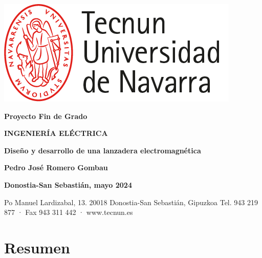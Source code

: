 \documentclass[a4paper,12pt]{article}
\newcommand{\boldcenteredtext}[1]{
  \begin{center}
    \textbf{\fontsize{12pt}{14pt}\selectfont #1}
  \end{center}
}
\newcommand{\largeboldcenteredtext}[1]{
  \begin{center}
    \textbf{\fontsize{16pt}{18pt}\selectfont #1}
  \end{center}
}
\newcommand{\boldrightalignedtext}[1]{
  \begin{flushright}
    \textbf{\fontsize{12pt}{14pt}\selectfont #1}
  \end{flushright}
}
\newcommand{\centeredtext}[1]{
  \begin{center}
    \fontsize{12pt}{14pt}\selectfont #1
  \end{center}
}
\begin{document}
\pagestyle{empty}

\begin{center}
  \includegraphics[width=0.4\linewidth, height=0.1\textheight]{FigurasMemoria/logoTecnun.png}
\end{center}

\vspace{1cm}

\boldcenteredtext{Proyecto Fin de Grado}

\largeboldcenteredtext{INGENIERÍA ELÉCTRICA}

\vspace{6cm}

\largeboldcenteredtext{Diseño y desarrollo de una lanzadera electromagnética}

\vspace{8cm}

\boldrightalignedtext{Pedro José Romero Gombau}
\boldrightalignedtext{Donostia-San Sebastián, mayo 2024}

\vspace{0.6cm}

\centeredtext{Po Manuel Lardizabal, 13. 20018 Donostia-San Sebastián, Gipuzkoa Tel. 943 219 877 · Fax 943 311 442 · www.tecnun.es}

\newpage
\thispagestyle{empty}
\mbox{}

\newpage
\thispagestyle{empty}
\tableofcontents

\newpage
\thispagestyle{empty}
\listoffigures

\newpage
\thispagestyle{empty}
\listoftables

\newpage
\thispagestyle{plain}
\section{Resumen}
\end{document}
